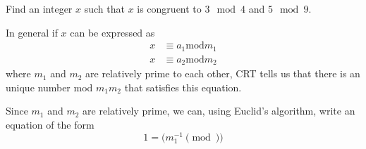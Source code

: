 \question Find an integer $x$ such that $x$ is congruent to $3 \mod 4$ and $5 \mod 9$.
\begin{solution}[1 in]
In general if $x$ can be expressed as
\begin{align*}
    x &\equiv a_1 \text{mod} m_1 \\
    x &\equiv a_2 \text{mod} m_2
\end{align*}
where $m_1$ and $m_2$ are relatively prime to each other, CRT tells us that there is an unique number mod $m_1m_2$ that satisfies this equation.

Since $m_1$ and $m_2$ are relatively prime, we can, using Euclid's algorithm, write an equation of the form
\[ 1 = (m_1^{-1} \pmod ) \]
\end{solution}
